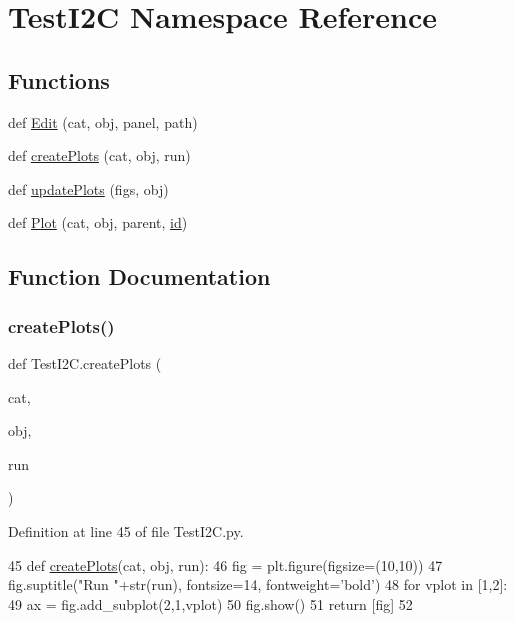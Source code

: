 \hypertarget{namespaceTestI2C}{}\section{Test\+I2C Namespace Reference}
\label{namespaceTestI2C}
\subsection*{Functions}
\begin{DoxyCompactItemize}
\item 
def \hyperlink{namespaceTestI2C_a297b4dc00ac23a510d82a60f41fa54bf}{Edit} (cat, obj, panel, path)
\item 
def \hyperlink{namespaceTestI2C_a9424711d097f77b29b742a87a2bae514}{create\+Plots} (cat, obj, run)
\item 
def \hyperlink{namespaceTestI2C_aa9a08a8ebd38789a067a3b54cdc231b5}{update\+Plots} (figs, obj)
\item 
def \hyperlink{namespaceTestI2C_a4c750a8d76615040e7e0203c9f2c4dd7}{Plot} (cat, obj, parent, \hyperlink{classObject_af99145335cc61ff6e2798ea17db009d2}{id})
\end{DoxyCompactItemize}


\subsection{Function Documentation}
\mbox{\label{namespaceTestI2C_a9424711d097f77b29b742a87a2bae514}} 
\subsubsection{\texorpdfstring{create\+Plots()}{createPlots()}}
{\footnotesize\ttfamily def Test\+I2\+C.\+create\+Plots (\begin{DoxyParamCaption}\item[{}]{cat,  }\item[{}]{obj,  }\item[{}]{run }\end{DoxyParamCaption})}



Definition at line 45 of file Test\+I2\+C.\+py.


\begin{DoxyCode}
45 \textcolor{keyword}{def }\hyperlink{namespaceTestI2C_a9424711d097f77b29b742a87a2bae514}{createPlots}(cat, obj, run):
46     fig = plt.figure(figsize=(10,10))
47     fig.suptitle(\textcolor{stringliteral}{"Run "}+str(run), fontsize=14, fontweight=\textcolor{stringliteral}{'bold'})
48     \textcolor{keywordflow}{for} vplot \textcolor{keywordflow}{in} [1,2]:
49         ax = fig.add\_subplot(2,1,vplot)
50     fig.show()    
51     \textcolor{keywordflow}{return} [fig]
52 
\end{DoxyCode}
\mbox{\label{namespaceTestI2C_a297b4dc00ac23a510d82a60f41fa54bf}} 
